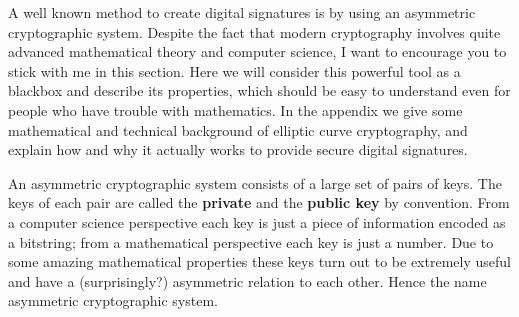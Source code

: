 \documentclass[a4paper,12pt,oneside,openany]{book}
\begin{document}
  A well known method to create
digital signatures is by using an \gls{asymmetric cryptographic system}.
Despite the fact that modern cryptography involves quite advanced
mathematical theory and computer science, I want to encourage you to
stick with me in this section.  Here we will consider this powerful tool
as a blackbox and describe its properties, which should be easy to
understand even for people who have trouble with mathematics.  In the
appendix we give some mathematical and technical
background of elliptic curve cryptography, and explain how and why it
actually works to provide secure digital signatures.

An asymmetric cryptographic system consists of a large set of pairs of
keys.  The keys of each pair are called the \textbf{private} and the
\textbf{public key} by convention.  From a computer science perspective
each key is just a piece of information encoded as a bitstring; from a
mathematical perspective each key is just a number.  Due to some amazing
mathematical properties these keys turn out to be extremely useful and
have a (surprisingly?) asymmetric relation to each other.  Hence the
name asymmetric cryptographic system.
\end{document}
